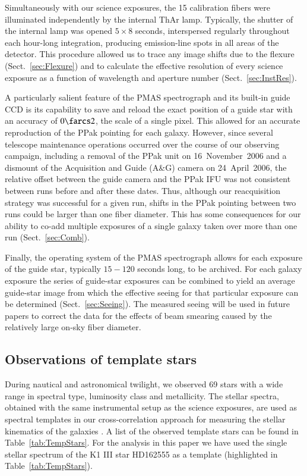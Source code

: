 \documentclass[traditabstract]{aa} %
\begin{document}
Simultaneously with our science exposures, the 15 calibration fibers were
illuminated independently by the internal ThAr lamp. Typically, the shutter of
the internal lamp was opened $5\times8$ seconds, interspersed regularly
throughout each hour-long integration, producing emission-line spots in all
areas of the detector.  This procedure allowed us to trace any image shifts due
to the flexure (Sect.~\ref{sec:Flexure}) and to calculate the effective
resolution of every science exposure as a function of wavelength and aperture
number (Sect.~\ref{sec:InstRes}).

A particularly salient feature of the PMAS spectrograph and its built-in guide
CCD is its capability to save and reload the exact position of a guide star with
an accuracy of $0\farcs2$, the scale of a single pixel.  This allowed for an
accurate reproduction of the PPak pointing for each galaxy.  However, since
several telescope maintenance operations occurred over the course of our
observing campaign, including a removal of the PPak unit on 16~November~2006 and
a dismount of the Acquisition and Guide (A\&G) camera on 24~April~2006, the
relative offset between the guide camera and the PPak IFU was not consistent
between runs before and after these dates. Thus, although our reacquisition
strategy was successful for a given run, shifts in the PPak pointing between two
runs could be larger than one fiber diameter.  This has some consequences for
our ability to co-add multiple exposures of a single galaxy taken over more than
one run (Sect.~\ref{sec:Comb}).

Finally, the operating system of the PMAS spectrograph allows for each exposure
of the guide star, typically $15-120$ seconds long, to be archived. For each
galaxy exposure the series of guide-star exposures can be combined to yield an
average guide-star image from which the effective seeing for that particular
exposure can be determined (Sect.~\ref{sec:Seeing}).  The measured seeing will
be used in future papers to correct the data for the effects of beam smearing
caused by the relatively large on-sky fiber diameter.


\subsection{Observations of template stars}
\label{sec:ObsTempStars}

During nautical and astronomical twilight, we observed 69 stars with a wide
range in spectral type, luminosity class and metallicity. The stellar spectra,
obtained with the same instrumental setup as the science exposures, are used as
spectral templates in our cross-correlation approach for measuring the stellar
kinematics of the galaxies \citep[][hereafter
]{westfall2011a}. A list of the observed template
stars can be found in Table~\ref{tab:TempStars}.  For the analysis in this paper
we have used the single stellar spectrum of the K1 III star HD162555 as a
template (highlighted in Table~\ref{tab:TempStars}).
\end{document}
